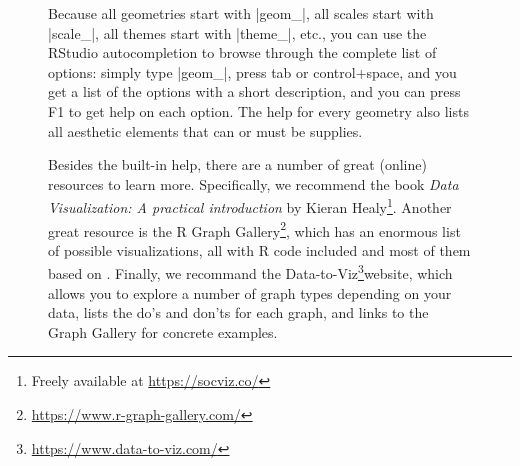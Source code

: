 \begin{figure}
\begin{feature}
Because all geometries start with |geom_|, all scales start with |scale_|, all themes start with |theme_|, etc., you can use the RStudio autocompletion to browse through the complete list of options: simply type |geom_|, press tab or control+space, and you get a list of the options with a short description, and you can press F1 to get help on each option. The help for every geometry also lists all aesthetic elements that can or must be supplies.

\newcommand{\fnviza}{\footnote{Freely available at \url{https://socviz.co/}}}
\newcommand{\fnvizb}{\footnote{\url{https://www.r-graph-gallery.com/}}}
\newcommand{\fnvizc}{\footnote{\url{https://www.data-to-viz.com/}}}
\nocite{healy2018data}

Besides the built-in help, there are a number of great (online) resources to learn more. Specifically, we recommend the book \emph{Data Visualization: A practical introduction} by Kieran Healy\fnviza. Another great resource is the R Graph Gallery\fnvizb, which has an enormous list of possible visualizations, all with R code included and most of them based on . Finally, we recommand the Data-to-Viz\fnvizc website, which allows you to explore a number of graph types depending on your data, lists the do's and don'ts for each graph, and links to the Graph Gallery for concrete examples.
\end{feature}
\end{figure}
